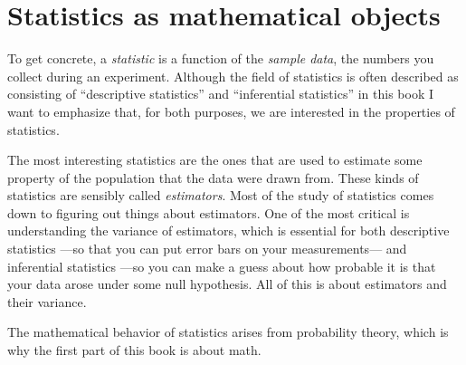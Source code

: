 \section{Statistics as mathematical objects}

To get concrete, a \emph{statistic} is a function of the \emph{sample data}, the numbers you collect during an experiment.
Although the field of statistics is often described as consisting of
``descriptive statistics'' and ``inferential statistics'' in this book I want to emphasize that,
for both purposes, we are interested in the properties of statistics.

The most interesting statistics are the ones that are used to estimate some
property of the population that the data were drawn from. These kinds of statistics are sensibly called
\emph{estimators}. Most of the study of statistics comes down to figuring out things
about estimators. One of the most critical is understanding the variance of
estimators, which is essential for both descriptive statistics ---so that you
can put error bars on your measurements--- and inferential statistics ---so you
can make a guess about how probable it is that your data arose under some null
hypothesis. All of this is about estimators and their variance.

The mathematical behavior of statistics arises from probability theory, which
is why the first part of this book is about math.
